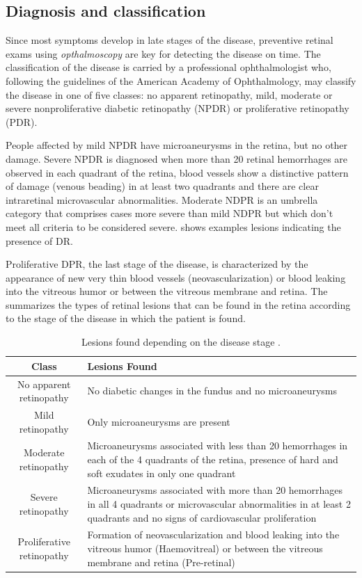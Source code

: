 \subsection{Diagnosis and classification}
Since most symptoms develop in late stages of the disease, preventive retinal exams using \textit{opthalmoscopy} are key for detecting the disease on time. The classification of the disease is carried by a professional ophthalmologist who, following the guidelines of the American Academy of Ophthalmology, may classify the disease in one of five classes: no apparent retinopathy, mild, moderate or severe nonproliferative diabetic retinopathy (NPDR) or proliferative retinopathy (PDR).

People affected by mild NPDR have microaneurysms in the retina, but no other damage. Severe NPDR is diagnosed when more than 20 retinal hemorrhages are observed in each quadrant of the retina, blood vessels show a distinctive pattern of damage (venous beading) in at least two quadrants and there are clear intraretinal microvascular abnormalities. Moderate NDPR is an umbrella category that comprises cases more severe than mild NDPR but which don't meet all criteria to be considered severe.  shows examples lesions indicating the presence of DR.

Proliferative DPR, the last stage of the disease, is characterized by the appearance of new very thin blood vessels (neovascularization) or blood leaking into the vitreous humor or between the vitreous membrane and retina. The  summarizes the types of retinal lesions that can be found in the retina according to the stage of the disease in which the patient is found. 
\begin{table}[htbp]
\centering
\small
\begin{tabularx}{\textwidth}{|c|X|}
\hline
Class & Lesions Found \\ \hline \hline
No apparent retinopathy & No diabetic changes in the fundus and no microaneurysms \\ \hline
Mild retinopathy & Only microaneurysms are present \\ \hline
Moderate retinopathy & Microaneurysms associated with less than 20 hemorrhages in each of the 4 quadrants of the retina, presence of hard and soft exudates in only one quadrant \\ \hline
Severe retinopathy & Microaneurysms associated with more than 20 hemorrhages in all 4 quadrants or microvascular abnormalities in at least 2 quadrants and no signs of cardiovascular proliferation \\ \hline
Proliferative retinopathy & Formation of neovascularization and blood leaking into the vitreous humor (Haemovitreal) or between the vitreous membrane and retina (Pre-retinal) \\ \hline
\end{tabularx}
\caption{Lesions found depending on the disease stage \cite{diabetesSymptoms}. }
\label{table:StagesDisease}
\end{table}

